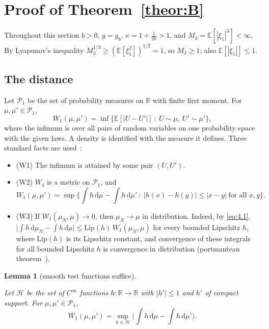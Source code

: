 \documentclass[aip,jmp,preprint,onecolumn,floatfix,superscriptaddress,nofootinbib,11pt]{revtex4-2}
\theoremstyle{plain}
\newtheorem{lemma}{Lemma}
\theoremstyle{remark}
\numberwithin{equation}{section}
\newcommand{\dd}{\mathrm{d}}
\newcommand{\E}{\mathbb{E}}
\begin{document}
\section{Proof of Theorem~\ref{theor:B}}\label{sec:4}
 
 
Throughout this section $b>0$, $g=g_b$, $\kappa=1+\tfrac{1}{2b}>1$, and $M_3=\E[|\xi_1|^{3}]<\infty$. By Lyapunov's inequality $M_3^{1/3}\ge(\E[\xi_1^{2}])^{1/2}=1$, so $M_3\ge1$; also $\E[|\xi_1|]\le1$.
 
\subsection{The distance}\label{sec:4_1}
 
Let $\mathcal P_1$ be the set of probability measures on $\mathbb R$ with finite first moment. For $\mu,\mu'\in\mathcal P_1$,
%
\begin{equation*}
W_1(\mu,\mu')=\inf\big\{\E[|U-U'|]\ :\ U\sim\mu,\ U'\sim\mu'\big\},
\end{equation*}
%
where the infimum is over all pairs of random variables on one probability space with the given laws. A density is identified with the measure it defines. Three standard facts are used~\cite{Villani}:
 
\begin{itemize}
\item (W1) The infimum is attained by some pair $(U,U')$.
\item (W2) $W_1$ is a metric on $\mathcal P_1$, and
\begin{equation}
W_1(\mu,\mu')=\sup\Big\{\int h\,\dd\mu-\int h\,\dd\mu'\ :\ |h(x)-h(y)|\le|x-y|\ \text{for all }x,y\Big\}.
\label{eq:4.1}
\end{equation}
 
\item (W3) If $W_1(\mu_N,\mu)\to0$, then $\mu_N\to\mu$ in distribution. Indeed, by \eqref{eq:4.1}, $\big|\int h\,\dd\mu_N-\int h\,\dd\mu\big|\le \mathrm{Lip}(h)\,W_1(\mu_N,\mu)$ for every bounded Lipschitz $h$, where $\mathrm{Lip}(h)$ is its Lipschitz constant, and convergence of these integrals for all bounded Lipschitz $h$ is convergence in distribution (portmanteau theorem~\cite{Billingsley}).
\end{itemize}
 
\begin{lemma}[smooth test functions suffice]\label{lem:3}
 
Let $\mathcal H$ be the set of $C^\infty$ functions $h:\mathbb R\to\mathbb R$ with $|h'|\le1$ and $h'$ of compact support. For $\mu,\mu'\in\mathcal P_1$,
%
\begin{equation*}
W_1(\mu,\mu')=\sup_{h\in\mathcal H}\Big(\int h\,\dd\mu-\int h\,\dd\mu'\Big).
\end{equation*}
 
\end{lemma}
 
\end{document}
